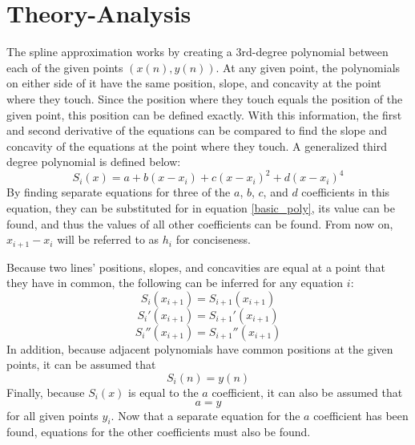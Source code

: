 \documentclass[12pt, letterpaper]{article} %
\begin{document}
\section*{Theory-Analysis}
The spline approximation works by creating a 3rd-degree polynomial between each of the given points \((x(n), y(n))\). At any given point, the polynomials on either side of it have the same position, slope, and concavity at the point where they touch. Since the position where they touch equals the position of the given point, this position can be defined exactly. With this information, the first and second derivative of the equations can be compared to find the slope and concavity of the equations at the point where they touch. A generalized third degree polynomial is defined below:
\begin{equation}
S_i(x) = a + b(x - x_i) + c(x - x_i)^2 + d(x - x_i)^4
\label{basic_poly}
\end{equation}
By finding separate equations for three of the $a$, $b$, $c$, and $d$ coefficients in this equation, they can be substituted for in equation \ref{basic_poly}, its value can be found, and thus the values of all other coefficients can be found.
From now on, \(x_{i + 1} - x_i\) will be referred to as \(h_i\) for conciseness.

Because two lines' positions, slopes, and concavities are equal at a point that they have in common, the following can be inferred for any equation \(i\):
\begin{equation}
S_i(x_{i+1}) = S_{i+1}(x_{i+1})
\label{0th_deriv}
\end{equation}
\begin{equation}
S_i'(x_{i+1}) = S_{i+1}'(x_{i+1})
\label{1st_deriv}
\end{equation}
\begin{equation}
S_i''(x_{i+1}) = S_{i+1}''(x_{i+1})
\label{2nd_deriv}
\end{equation}
In addition, because adjacent polynomials have common positions at the given points, it can be assumed that
\begin{equation}
S_i(n) = y(n)
\label{si.eq.y}
\end{equation}
Finally, because \(S_i(x)\) is equal to the \(a\) coefficient, it can also be assumed that
\begin{equation}
a = y
\label{a.eq.y}
\end{equation}
for all given points \(y_i\). Now that a separate equation for the $a$ coefficient has been found, equations for the other coefficients must also be found. 
\end{document}
